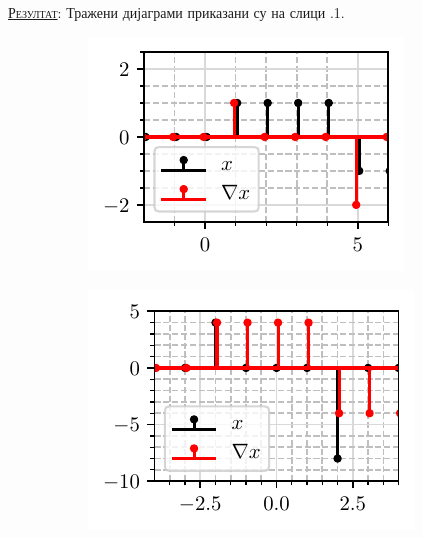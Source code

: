 \textsc{\underline{Резултат}}: 
Тражени дијаграми приказани су 
на слици \ID.1. \\
\begin{figure}[ht!]
    \hspace*{0pt}\hfill
    \begin{subfigure}[c]{0.45\textwidth}
        \centering
        \includegraphics[scale=1]{fig/crtaj_dt_a.pdf}
        \caption{}
    \end{subfigure}
    \hspace*{0pt}\hfill
    \begin{subfigure}[c]{0.45\textwidth}
        \centering
        \includegraphics[scale=1]{fig/crtaj_dt_b.pdf}
        \caption{}
    \end{subfigure}
    \hfill
    \hspace*{0pt}


\end{figure}
